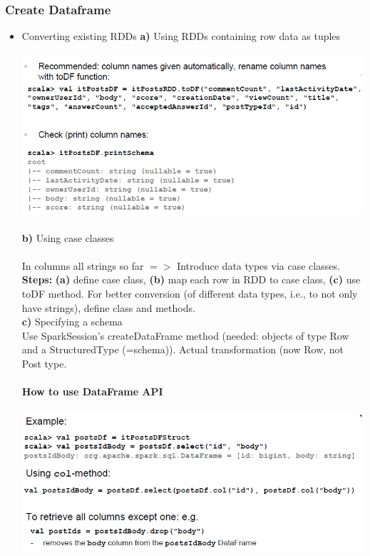 \documentclass{article}
\begin{document}
\subsubsection{Create Dataframe}
\begin{itemize}
\item Converting existing RDDs
\textbf{a)} Using RDDs containing row data as tuples\\\\
\includegraphics[scale=0.6]{52.png}\\\\
\textbf{b)} Using case classes\\\\
In columns all strings so far $=>$ Introduce data types via case classes.\\
\textbf{Steps: }\textbf{(a)} define case class, \textbf{(b)} map each row in RDD to case class, \textbf{(c)} use toDF method. For better conversion (of different data types, i.e., to not only have strings), define class and methods.\\
\textbf{c)} Specifying a schema\\
Use SparkSession’s createDataFrame method (needed: objects of type Row and a StructuredType (=schema)). Actual transformation (now Row, not Post type.\\\\
\textbf{How to use DataFrame API}\\\\
\includegraphics[scale=0.6]{53.png}

\end{itemize}
\end{document}
